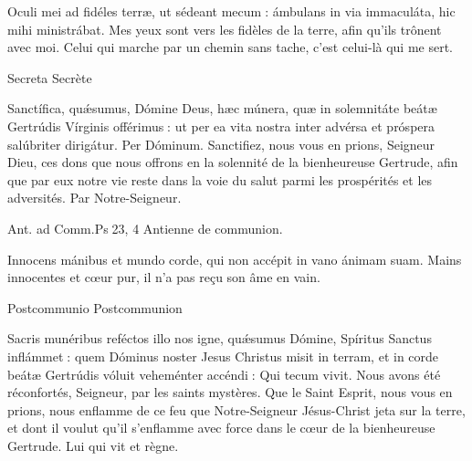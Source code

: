 \begin{paracol}{2}
Oculi mei ad fidéles terræ, ut sédeant mecum : ámbulans in via immaculáta, hic mihi ministrábat.
\switchcolumn
Mes yeux sont vers les fidèles de la terre, afin qu’ils trônent avec moi. Celui qui marche par un chemin sans tache, c’est celui-là qui me sert.
\switchcolumn*

Secreta
\switchcolumn
Secrète
\switchcolumn*

Sanctífica, quǽsumus, Dómine Deus,  hæc múnera, quæ in solemnitáte beátæ Gertrúdis Vírginis offérimus : ut per ea vita nostra inter advérsa et próspera salúbriter dirigátur. Per Dóminum.
\switchcolumn
Sanctifiez, nous vous en prions, Seigneur  Dieu, ces dons que nous offrons en la solennité de la bienheureuse Gertrude, afin que par eux notre vie reste dans la voie du salut parmi les prospérités et les adversités. Par Notre-Seigneur.
\switchcolumn*

Ant. ad Comm.\hfill Ps 23, 4
\switchcolumn
Antienne de communion.
\switchcolumn*

Innocens mánibus et mundo corde, qui non accépit in vano ánimam suam.
\switchcolumn
Mains innocentes et cœur pur, il n’a pas reçu son âme en vain.
\switchcolumn*

Postcommunio
\switchcolumn
Postcommunion
\switchcolumn*

Sacris munéribus reféctos illo nos  igne, quǽsumus Dómine, Spíritus Sanctus inflámmet : quem Dóminus noster Jesus Christus misit in terram, et in corde beátæ Gertrúdis vóluit veheménter accéndi : Qui tecum vivit.
\switchcolumn
Nous avons été réconfortés, Seigneur,  par les saints mystères. Que le Saint Esprit, nous vous en prions, nous enflamme de ce feu que Notre-Seigneur Jésus-Christ jeta sur la terre, et dont il voulut qu’il s’enflamme avec force dans le cœur de la bienheureuse Gertrude. Lui qui vit et règne.
\switchcolumn*

\end{paracol}













